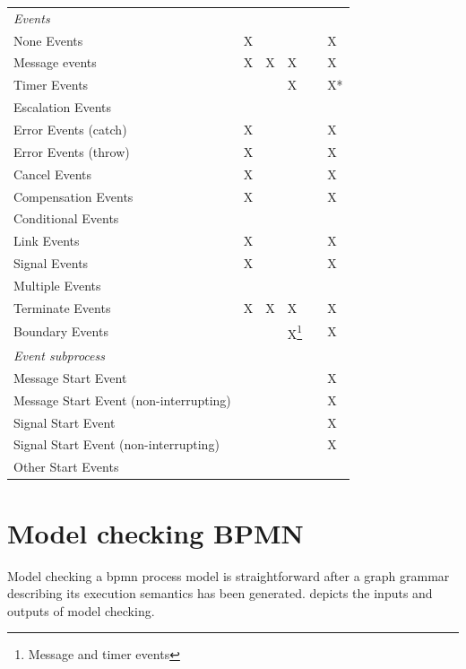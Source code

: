 \documentclass[adraft, copyright, creativecommons]{eptcs} %
\begin{document}
\begin{table}[htbp]
\begin{tabular}{l l l l l l}
      \textit{Events} &  &  &  &  & \\
      None Events & X & & &  & X\\
      Message events & X & X & X &  & X\\
      Timer Events & & & X &  & X*\\
      Escalation Events & & & &  & \\
      Error Events (catch) & X & & &  & \color{yellow}X\\ %
      Error Events (throw) & X & & &  & \color{yellow}X\\
      Cancel Events & X & & &  & \color{yellow}X\\
      Compensation Events & X & & &  & \color{yellow}X\\
      Conditional Events &  & & &  & \\
      Link Events & X & & &  & X\\
      Signal Events & X & & &  & X\\
      Multiple Events &  & & &  & \\
      Terminate Events & X & X & X & & X\\
     Boundary Events & & & X\footnote{Message and timer events} &  & X\\ %
      \textit{Event subprocess} &  &  &  &  & \\
      Message Start Event &  & & &  & X\\
      Message Start Event (non-interrupting) & & & &  & X\\
      Signal Start Event &  & & &  & X\\
      Signal Start Event (non-interrupting) &  & & &  & X\\
      Other Start Events &  & & &  & \\ %
    \end{tabular}

\end{table}


\section{Model checking BPMN}
Model checking a \gls*{bpmn} process model is straightforward after a graph grammar describing its execution semantics has been generated.
 depicts the inputs and outputs of model checking.
\end{document}
